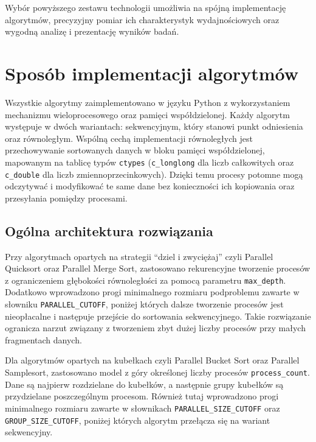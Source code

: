 Wybór powyższego zestawu technologii umożliwia na spójną implementację algorytmów, precyzyjny pomiar ich charakterystyk wydajnościowych 
oraz wygodną analizę i prezentację wyników badań.

\section{Sposób implementacji algorytmów}
\label{sec:SposobImplementacji}

Wszystkie algorytmy zaimplementowano w języku Python z wykorzystaniem mechanizmu wieloprocesowego oraz pamięci współdzielonej. 
Każdy algorytm występuje w dwóch wariantach: sekwencyjnym, który stanowi punkt odniesienia oraz równoległym. 
Wspólną cechą implementacji równoległych jest przechowywanie sortowanych danych w bloku pamięci współdzielonej, 
mapowanym na tablicę typów \texttt{ctypes} (\texttt{c\_longlong} dla liczb całkowitych oraz \texttt{c\_double} dla liczb zmiennoprzecinkowych). 
Dzięki temu procesy potomne mogą odczytywać i modyfikować te same dane bez konieczności ich kopiowania oraz przesyłania pomiędzy procesami.

\subsection{Ogólna architektura rozwiązania}

Przy algorytmach opartych na strategii ``dziel i zwyciężaj'' czyli Parallel Quicksort oraz Parallel Merge Sort, 
zastosowano rekurencyjne tworzenie procesów z ograniczeniem głębokości równoległości za pomocą parametru \texttt{max\_depth}. 
Dodatkowo wprowadzono progi minimalnego rozmiaru podproblemu zawarte w słowniku \texttt{PARALLEL\_\allowbreak CUTOFF}, 
poniżej których dalsze tworzenie procesów jest nieopłacalne i następuje przejście do sortowania sekwencyjnego. 
Takie rozwiązanie ogranicza narzut związany z tworzeniem zbyt dużej liczby procesów przy małych fragmentach danych.

Dla algorytmów opartych na kubełkach czyli Parallel Bucket Sort oraz Parallel Samplesort, zastosowano model z góry określonej liczby 
procesów \texttt{process\_count}. Dane są najpierw rozdzielane do kubełków, a następnie grupy kubełków są przydzielane poszczególnym procesom. 
Również tutaj wprowadzono progi minimalnego rozmiaru zawarte w słownikach \texttt{PARALLEL\_\allowbreak SIZE\_\allowbreak CUTOFF} 
oraz \texttt{GROUP\_\allowbreak SIZE\_\allowbreak CUTOFF}, poniżej których algorytm przełącza się na wariant sekwencyjny.

